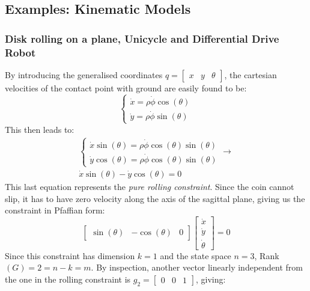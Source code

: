 \subsection{Examples: Kinematic Models}
\subsubsection{Disk rolling on a plane, Unicycle and Differential Drive Robot}
By introducing the generalised coordinates $q=\begin{bmatrix}x & y & \theta\end{bmatrix}$, the cartesian velocities of the contact point with ground are easily found to be:
\begin{equation*}
    \begin{cases}
        \dot{x}=\rho \dot{\phi} \cos(\theta) \\
        \dot{y}=\rho \dot{\phi} \sin(\theta) 
    \end{cases}
\end{equation*}
This then leads to:
\begin{gather*}
    \begin{cases}
        \dot{x}\sin(\theta)=\rho \dot{\phi} \cos(\theta) \sin(\theta) \\
        \dot{y} \cos(\theta) = \rho \dot{\phi} \cos(\theta) \sin(\theta) 
    \end{cases}\rightarrow \\
    \dot{x}\sin(\theta)-\dot{y}\cos(\theta)=0
\end{gather*}
This last equation represents the \textit{pure rolling constraint}. Since the coin cannot slip, it has to have zero velocity along the axis of the sagittal plane, giving us the constraint in Pfaffian form:
\begin{equation*}
    \begin{bmatrix}
        \sin(\theta) & -\cos(\theta) & 0
    \end{bmatrix}
    \begin{bmatrix}
        \dot{x} \\ \dot{y} \\ \dot{\theta}
    \end{bmatrix}
    =0
\end{equation*}
Since this constraint has dimension $k=1$ and the state space $n=3$, Rank$(G)=2=n-k=m$. By inspection, another vector linearly independent from the one in the rolling constraint is $g_2=\begin{bmatrix} 0 & 0 & 1 \end{bmatrix}$, giving:
